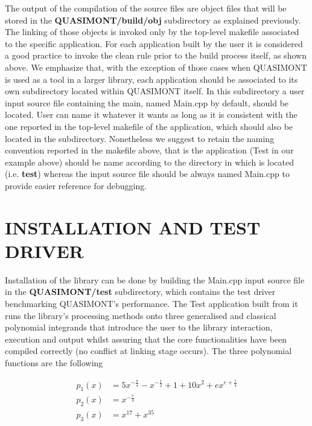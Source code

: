 \documentclass[a4paper, twosided]{book}
\begin{document}
\noindent
The output of the compilation of the source files are object files that will be stored in the \colorbox{poliGrayBlue}{\textbf{QUASIMONT/build/obj}} subdirectory as explained previously. The linking of those objects is invoked only by the top-level makefile associated to the specific application. For each application built by the user it is considered a good practice to invoke the \colorbox{poliGrayBlue}{clean} rule prior to the build process itself, as shown above. We emphasize that, with the exception of those cases when QUASIMONT is used as a tool in a larger library, each application should be associated to its own subdirectory located within QUASIMONT itself. In this subdirectory a user input source file containing the \colorbox{poliGrayBlue}{main}, named \colorbox{poliGrayBlue}{Main.cpp} by default, should be located. User can name it whatever it wants as long as it is consistent with the one reported in the top-level \colorbox{poliGrayBlue}{makefile} of the application, which should also be located in the subdirectory. Nonetheless we suggest to retain the naming convention reported in the \colorbox{poliGrayBlue}{makefile} above, that is the application (\colorbox{poliGrayBlue}{Test} in our example above) should be name according to the directory in which is located (i.e. \colorbox{poliGrayBlue}{\textbf{test}}) whereas the input source file should be always named \colorbox{poliGrayBlue}{Main.cpp} to provide easier reference for debugging.

\newpage
\section[Installation and test driver]{\changefont INSTALLATION AND TEST DRIVER}\label{Sec2.4}

\noindent
Installation of the library can be done by building the \colorbox{poliGrayBlue}{Main.cpp} input source file in the \colorbox{poliGrayBlue}{\textbf{QUASIMONT/test}} subdirectory, which contains the test driver benchmarking QUASIMONT's performance. The \colorbox{poliGrayBlue}{Test} application built from it runs the library's processing methods onto three generalised and classical polynomial integrands that introduce the user to the library interaction, execution and output whilst assuring that the core functionalities have been compiled correctly (no conflict at linking stage occurs). The three polynomial functions are the following

\begin{equation*}
    \begin{split}
        p_1(x) & = 5x^{-\frac{\pi}{4}}-x^{-\frac{1}{2}}+1+10x^{2}+ex^{e+\frac{1}{4}} \\
        p_2(x) & = x^{-\frac{e}{3}} \\
        p_3(x) & = x^{17} + x^{35}
    \end{split}
\end{equation*}
\end{document}
